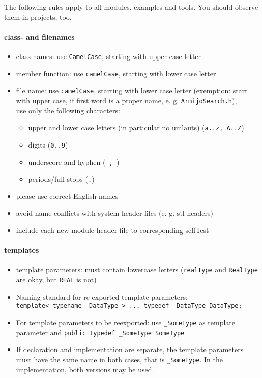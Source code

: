 
The following rules apply to all modules, examples and tools. You should observe them in projects, too.

\paragraph{class- and filenames}

\begin{itemize}
  \item class names: use \verb|CamelCase|, starting with upper case letter
  \item member function: use \verb|camelCase|, starting with lower case letter
  \item file name: use \verb|camelCase|, starting with lower case letter (exemption: start with upper case,
        if first word is a proper name, e. g. \verb|ArmijoSearch.h|), \\
        use only the following characters:
        \begin{itemize}
          \item upper and lower case letters (in particular no umlauts) (\texttt{a..z, A..Z})
          \item digits (\texttt{0..9})
          \item underscore and hyphen (\texttt{\_,-})
          \item periods/full stops (\texttt{.})
        \end{itemize}
  \item please use correct English names
  \item avoid name conflicts with system header files (e. g. stl headers)
  \item include each new module header file to corresponding selfTest
\end{itemize}


\paragraph{templates}

\begin{itemize}
  \item template parameters: must contain lowercase letters (\verb|realType| and \verb|RealType|
        are okay, but \verb|REAL| is not)
  \item Naming standard for re-exported template parameters: \\
        \verb|template< typename _DataType > ... typedef _DataType DataType;|
  \item For template parameters to be reexported: use \verb|_SomeType| as template parameter and
        \verb|public typedef _SomeType SomeType|
  \item If declaration and implementation are separate, the template parameters must have the
        same name in both cases, that is \verb|_SomeType|. In the implementation, both versions
        may be used.
\end{itemize}


